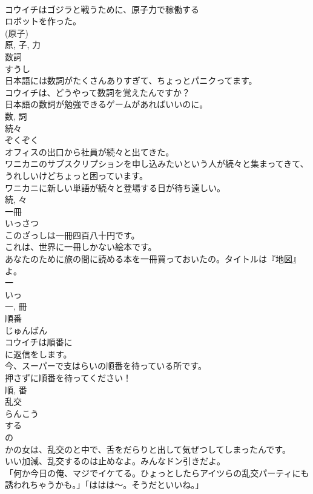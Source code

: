 \documentclass[8pt]{extreport}
\begin{document}
\begin{CJK}{UTF8}{min}
\\	コウイチはゴジラと戦うために、原子力で稼働する
\\	ロボットを作った。	
\\	(原子) 
\\	原, 子, 力	
\\	数詞	
\\	すうし	
\\	日本語には数詞がたくさんありすぎて、ちょっとパニクってます。	
\\	コウイチは、どうやって数詞を覚えたんですか？	
\\	日本語の数詞が勉強できるゲームがあればいいのに。	
\\	数, 詞	
\\	続々	
\\	ぞくぞく	
\\	オフィスの出口から社員が続々と出てきた。	
\\	ワニカニのサブスクリプションを申し込みたいという人が続々と集まってきて、うれしいけどちょっと困っています。	
\\	ワニカニに新しい単語が続々と登場する日が待ち遠しい。	
\\	続, 々	
\\	一冊	
\\	いっさつ	
\\	このざっしは一冊四百八十円です。	
\\	これは、世界に一冊しかない絵本です。	
\\	あなたのために旅の間に読める本を一冊買っておいたの。タイトルは『地図』よ。	
\\	一 
\\	いっ 
\\	一, 冊	
\\	順番	
\\	じゅんばん	
\\	コウイチは順番に
\\	に返信をします。	
\\	今、スーパーで支はらいの順番を待っている所です。	
\\	押さずに順番を待ってください！	
\\	順, 番	
\\	乱交	
\\	らんこう	
\\	する 
\\	の 
\\	かの女は、乱交のと中で、舌をだらりと出して気ぜつしてしまったんです。	
\\	いい加減、乱交するのは止めなよ。みんなドン引きだよ。	
\\	「何か今日の俺、マジでイケてる。ひょっとしたらアイツらの乱交パーティにも誘われちゃうかも。」「ははは〜。そうだといいね。」	

\end{CJK}
\end{document}
